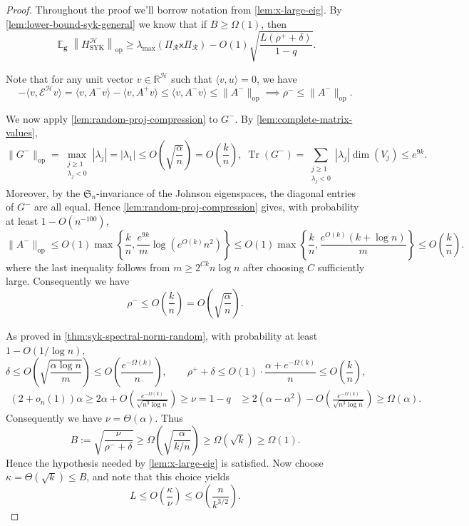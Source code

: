 \documentclass[10pt,a4paper]{amsart}
\DeclareMathOperator*{\E}{\mathbb{E}}
\newcommand{\R}{{\mathbb R}}
\newcommand{\Tr}{\operatorname{Tr}}
\newcommand{\cH}{\mathcal H}
\newcommand{\cR}{\mathcal R}
\newcommand{\sfx}{\mathsf x}
\renewcommand{\geq}{\geqslant}
\renewcommand{\leq}{\leqslant}
\begin{document}
\begin{proof}
Throughout the proof we'll borrow notation from \cref{lem:x-large-eig}. By \cref{lem:lower-bound-syk-general} we know that if $B\geq\Omega(1)$, then
\begin{equation}
\label{eq:random-lower-transfer}
\E_{\bm g}\left\|H^\cH_{\operatorname{SYK}}\right\|_{\operatorname{op}}\geq\lambda_{\max}\!\left(\Pi_\cR\sfx\Pi_\cR\right)-O(1)\sqrt{\frac{L(\rho^++\delta)}{1-q}}.
\end{equation}

Note that for any unit vector $v\in\R^\cH$ such that $\langle v, u\rangle = 0$, we have
\begin{equation*}
-\langle v,\mathcal E^\cH v\rangle = \langle v,A^-v\rangle-\langle v,A^+v\rangle \leq \langle v,A^-v\rangle \leq \|A^-\|_{\operatorname{op}}\implies\rho^-\leq \|A^-\|_{\operatorname{op}}.
\end{equation*}

We now apply \cref{lem:random-proj-compression} to $G^-$. By
\cref{lem:complete-matrix-values},
\[\|G^-\|_{\operatorname{op}} = \max_{\substack{j\geq1\\\lambda_j<0}}|\lambda_j| = |\lambda_1| \leq O\left(\sqrt{\frac{\alpha}{n}}\right) = O\left(\frac{k}{n}\right),\;\Tr(G^-) = \sum_{\substack{j\geq1\\\lambda_j<0}}|\lambda_j|\dim(V_j)\leq e^{9k}.\]
Moreover, by the $\mathfrak{S}_n$-invariance of the Johnson eigenspaces,
the diagonal entries of $G^-$ are all equal. Hence
\cref{lem:random-proj-compression} gives, with probability at least
$1-O(n^{-100})$,
\[\|A^-\|_{\operatorname{op}}\leq O(1)\max\left\{\frac{k}{n}, \frac{e^{9k}}{m}\log\left(e^{O(k)}n^2\right)\right\}\leq O(1)\max\left\{\frac{k}{n}, \frac{e^{O(k)}(k+\log n)}{m}\right\}\leq O\left(\frac{k}{n}\right).\]
where the last inequality follows from
$m\geq2^{Ck}n\log n$ after choosing $C$ sufficiently large. Consequently we have
\[\rho^-\leq O\left(\frac{k}{n}\right) = O\left(\sqrt{\frac{\alpha}{n}}\right).\]

As proved in \cref{thm:syk-spectral-norm-random}, with probability at
least $1-O(1/\log n)$,
\[\delta\leq O\left(\sqrt{\frac{\alpha\log n}{m}}\right)\leq O\left(\frac{e^{-\Omega(k)}}{n}\right),\qquad \rho^++\delta\leq O(1)\cdot\frac{\alpha+e^{-\Omega(k)}}{n}\leq O\left(\frac{k}{n}\right),\]
\begin{align*}
(2 + o_n(1))\alpha\geq 2\alpha + O\!\left(
\frac{e^{-\Omega(k)}}{\sqrt{n^3\log n}}
\right)\geq\nu = 1-q
&\geq
2(\alpha-\alpha^2)
-
O\!\left(
\frac{e^{-\Omega(k)}}{\sqrt{n^3\log n}}
\right)
\geq \Omega(\alpha).
\end{align*}
Consequently we have $\nu = \Theta(\alpha)$. Thus
\[
B
:=
\sqrt{\frac{\nu}{\rho^- + \delta}}
 \geq
\Omega\!\left(
\sqrt{\frac{\alpha}{k/n}}
\right)
\geq
\Omega(\sqrt{k})
\geq\Omega(1).
\]
Hence the hypothesis needed by \cref{lem:x-large-eig} is satisfied. Now choose $\kappa = \Theta(\sqrt{k})\leq B$, and note that this choice yields 
\[L\leq O\left(\frac{\kappa}{\nu}\right)\leq O\!\left(\frac{n}{k^{3/2}}\right).\]


\end{proof}
\end{document}
